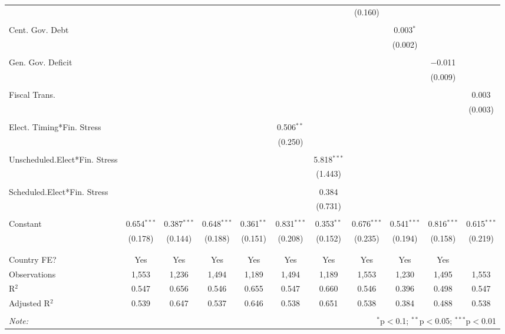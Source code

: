 \begin{table}[!htbp]
\begin{tabular}{@{\extracolsep{5pt}}lcccccccccc}
  &  &  &  &  &  &  & (0.160) &  &  &  \\ 
  & & & & & & & & & & \\ 
 Cent. Gov. Debt &  &  &  &  &  &  &  & 0.003$^{*}$ &  &  \\ 
  &  &  &  &  &  &  &  & (0.002) &  &  \\ 
  & & & & & & & & & & \\ 
 Gen. Gov. Deficit &  &  &  &  &  &  &  &  & $-$0.011 &  \\ 
  &  &  &  &  &  &  &  &  & (0.009) &  \\ 
  & & & & & & & & & & \\ 
 Fiscal Trans. &  &  &  &  &  &  &  &  &  & 0.003 \\ 
  &  &  &  &  &  &  &  &  &  & (0.003) \\ 
  & & & & & & & & & & \\ 
 Elect. Timing*Fin. Stress &  &  &  &  & 0.506$^{**}$ &  &  &  &  &  \\ 
  &  &  &  &  & (0.250) &  &  &  &  &  \\ 
  & & & & & & & & & & \\ 
 Unscheduled.Elect*Fin. Stress &  &  &  &  &  & 5.818$^{***}$ &  &  &  &  \\ 
  &  &  &  &  &  & (1.443) &  &  &  &  \\ 
  & & & & & & & & & & \\ 
 Scheduled.Elect*Fin. Stress &  &  &  &  &  & 0.384 &  &  &  &  \\ 
  &  &  &  &  &  & (0.731) &  &  &  &  \\ 
  & & & & & & & & & & \\ 
 Constant & 0.654$^{***}$ & 0.387$^{***}$ & 0.648$^{***}$ & 0.361$^{**}$ & 0.831$^{***}$ & 0.353$^{**}$ & 0.676$^{***}$ & 0.541$^{***}$ & 0.816$^{***}$ & 0.615$^{***}$ \\ 
  & (0.178) & (0.144) & (0.188) & (0.151) & (0.208) & (0.152) & (0.235) & (0.194) & (0.158) & (0.219) \\ 
  & & & & & & & & & & \\ 
\hline \\[-1.8ex] 
Country FE? & Yes & Yes & Yes & Yes & Yes & Yes & Yes & Yes & Yes &  \\ 
Observations & 1,553 & 1,236 & 1,494 & 1,189 & 1,494 & 1,189 & 1,553 & 1,230 & 1,495 & 1,553 \\ 
R$^{2}$ & 0.547 & 0.656 & 0.546 & 0.655 & 0.547 & 0.660 & 0.546 & 0.396 & 0.498 & 0.547 \\ 
Adjusted R$^{2}$ & 0.539 & 0.647 & 0.537 & 0.646 & 0.538 & 0.651 & 0.538 & 0.384 & 0.488 & 0.538 \\ 
\hline 
\hline \\[-1.8ex] 
\textit{Note:}  & \multicolumn{10}{r}{$^{*}$p$<$0.1; $^{**}$p$<$0.05; $^{***}$p$<$0.01} \\ 
\end{tabular} 
\end{table} 
